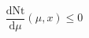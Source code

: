 \documentclass[preview]{standalone}
\begin{document}
\begin{equation}
\tag{32}
    \frac{\mathrm{d}\mathrm{Nt}}{\mathrm{d}\mu} ( \mu , x ) \leq 0
\end{equation}
\end{document}
